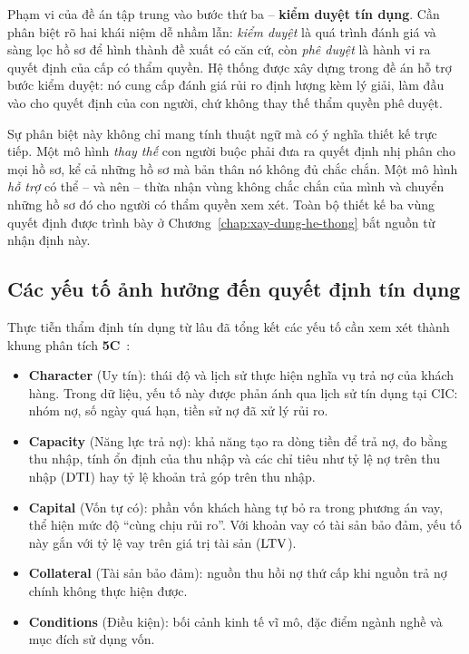 Phạm vi của đề án tập trung vào bước thứ ba -- \textbf{kiểm duyệt tín dụng}. Cần
phân biệt rõ hai khái niệm dễ nhầm lẫn: \textit{kiểm duyệt} là quá trình đánh giá
và sàng lọc hồ sơ để hình thành đề xuất có căn cứ, còn \textit{phê duyệt} là hành
vi ra quyết định của cấp có thẩm quyền. Hệ thống được xây dựng trong đề án hỗ trợ
bước kiểm duyệt: nó cung cấp đánh giá rủi ro định lượng kèm lý giải, làm đầu vào
cho quyết định của con người, chứ không thay thế thẩm quyền phê duyệt.

Sự phân biệt này không chỉ mang tính thuật ngữ mà có ý nghĩa thiết kế trực tiếp.
Một mô hình \textit{thay thế} con người buộc phải đưa ra quyết định nhị phân cho
mọi hồ sơ, kể cả những hồ sơ mà bản thân nó không đủ chắc chắn. Một mô hình
\textit{hỗ trợ} có thể -- và nên -- thừa nhận vùng không chắc chắn của mình và
chuyển những hồ sơ đó cho người có thẩm quyền xem xét. Toàn bộ thiết kế ba vùng
quyết định được trình bày ở Chương~\ref{chap:xay-dung-he-thong} bắt nguồn từ nhận
định này.

\subsection{Các yếu tố ảnh hưởng đến quyết định tín dụng}
\label{subsec:yeu-to-anh-huong}

Thực tiễn thẩm định tín dụng từ lâu đã tổng kết các yếu tố cần xem xét thành
khung phân tích \textbf{5C}~\cite{thomas2017}:

\begin{itemize}
  \item \textbf{Character} (Uy tín): thái độ và lịch sử thực hiện nghĩa vụ trả nợ
  của khách hàng. Trong dữ liệu, yếu tố này được phản ánh qua lịch sử tín dụng
  tại CIC: nhóm nợ, số ngày quá hạn, tiền sử nợ đã xử lý rủi ro.

  \item \textbf{Capacity} (Năng lực trả nợ): khả năng tạo ra dòng tiền để trả nợ,
  đo bằng thu nhập, tính ổn định của thu nhập và các chỉ tiêu như tỷ lệ nợ trên
  thu nhập ($\mathrm{DTI}$) hay tỷ lệ khoản trả góp trên thu nhập.

  \item \textbf{Capital} (Vốn tự có): phần vốn khách hàng tự bỏ ra trong phương
  án vay, thể hiện mức độ ``cùng chịu rủi ro''. Với khoản vay có tài sản bảo đảm,
  yếu tố này gắn với tỷ lệ vay trên giá trị tài sản ($\mathrm{LTV}$).

  \item \textbf{Collateral} (Tài sản bảo đảm): nguồn thu hồi nợ thứ cấp khi nguồn
  trả nợ chính không thực hiện được.

  \item \textbf{Conditions} (Điều kiện): bối cảnh kinh tế vĩ mô, đặc điểm ngành
  nghề và mục đích sử dụng vốn.
\end{itemize}

